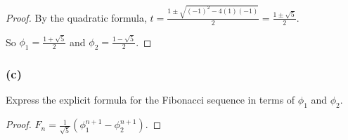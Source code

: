 \documentclass[14pt]{extarticle}
\newcommand{\dps}{\displaystyle}
\begin{document}
\begin{proof}
By the quadratic formula, \(\dps t = \frac{1 \pm \sqrt{(-1)^2 - 4(1)(-1)}}{2} = \frac{1 \pm \sqrt{5}}{2}\).

So \(\dps \phi_1 = \frac{1 + \sqrt{5}}{2}\) and \(\dps \phi_2 = \frac{1 - \sqrt{5}}{2}\).
\end{proof}

\subsubsection{(c)}
Express the explicit formula for the Fibonacci sequence in terms of $\phi_1$ and $\phi_2$.

\begin{proof}
\(\dps F_n = \frac{1}{\sqrt{5}}(\phi_1^{n+1} - \phi_2^{n+1})\).
\end{proof}
\end{document}
